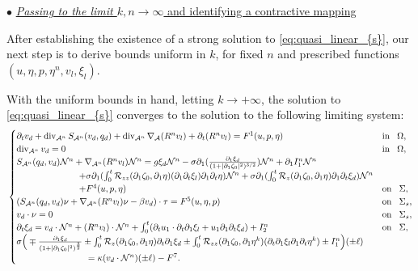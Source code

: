 \documentclass[letterpaper,reqno,10pt,twoside]{amsart}
\theoremstyle{definition}
\theoremstyle{remark}
\def\p{\partial}
\def\dive{\mathop{\rm div}\nolimits}
\begin{document}
	\noindent $\bullet$ \underline{\textsl{Passing to the limit  $k,n \to \infty$} and identifying a contractive mapping} 
	
	After establishing the existence of a strong solution to \eqref{eq:quasi_linear_{s}}, our next step is to derive bounds uniform in $k$, for fixed $n$ and prescribed functions $(u,\eta,p,\eta^{n},v_{l},\xi_{l})$.
	
	With the uniform bounds in hand, letting $k\to +\infty$, the solution to \eqref{eq:quasi_linear_{s}} converges to the solution to the following limiting system:
	\begin{equation}{\label{eq:quasi_linear_{k}}}
		\begin{cases}
			\partial_{t}v_{d}+\operatorname{div}_{\mathcal{A}^{n}}S_{\mathcal{A}^{n}}(v_{d},q_{d})+\dive_{\mathcal{A}^{n}}\nabla_{\mathcal{A}}(R^{n}v_{l})+\p_{t}(R^{n}v_{l})=F^{1}(u,p,\eta)~~~&\operatorname{in}~~\Omega,\\
			\operatorname{div}_{\mathcal{A}^{n}}v_{d}=0~~~&\operatorname{in}~~\Omega,\\
			S_{\mathcal{A}^{n}}(q_{d},v_{d})\mathcal{N}^{n}+\nabla_{\mathcal{A}^{n}}(R^{n}v_{l})\mathcal{N}^{n}=g\xi_{d}\mathcal{N}^{n}-\sigma\partial_{1}(\frac{\p_1\xi_d}{(1+\vert \partial_{1}\zeta_{0}\vert^{2})^{3/2}})\mathcal{N}^{n}+\p_{1}I^{n}_{1}\mathcal{N}^{n}\\
			\quad\quad\quad\quad\quad\quad\quad+\sigma\partial_{1}(\int_{0}^{t}\mathcal{R}_{zz}(\partial_{1}\zeta_{0},\partial_{1}\eta)(\partial_{1}\p_{t}\xi_{l})\p_{1}\p_{t}\eta)\mathcal{N}^{n}+\sigma\partial_{1}(\int_{0}^{t}\mathcal{R}_{z}(\partial_{1}\zeta_{0},\partial_{1}\eta)\partial_{1}\partial_{t}\xi_{d})\mathcal{N}^{n}\\
			\quad\quad\quad\quad\quad\quad\quad+F^{4}(u,p,\eta)~~~&\operatorname{on}~~\Sigma,\\
			(S_{\mathcal{A}^{n}}(q_{d},v_{d})\nu+\nabla_{\mathcal{A}^{n}}(R^{n}v_{l})\nu-\beta v_{d})\cdot \tau=F^{5}(u,\eta,p)~~~&\operatorname{on}~~\Sigma_{s},\\
			v_{d}\cdot \nu=0~~~&\operatorname{on}~~\Sigma_{s},\\
			\partial_{t}\xi_{d}=v_{d}\cdot \mathcal{N}^{n}+(R^{n}v_{l})\cdot \mathcal{N}^{n}+\int_{0}^{t}(\partial_{t}u_{1}\cdot\partial_{t}\p_{1}\xi_{l}+u_{1}\partial_{1}\partial_{t}\xi_{d})+I^{n}_{2}~~~&\operatorname{on}~~\Sigma,\\
			\sigma \Big(\mp \frac{\partial_{1}\xi_{d}}{(1+\vert \partial_{1}\zeta_{0}\vert^{2})^{\frac{3}{2}}}\pm \int_{0}^{t}\mathcal{R}_{z}(\partial_{1}\zeta_{0},\partial_{1}\eta)\partial_{t}\partial_{1}\xi_{d}\pm\int_{0}^{t}\mathcal{R}_{zz}(\p_{1}\zeta_{0},\p_{1}\eta^{k})(\p_{t}\p_{1}\xi_{l}\p_{1}\p_{t}\eta^{k})\pm I^{n}_{1} \Big)(\pm \ell)\\
			\quad\quad\quad\quad\quad\quad\quad\quad=\kappa (v_{d}\cdot \mathcal{N}^{n})(\pm \ell)-{F}^{7}.
		\end{cases}
	\end{equation}
	
\end{document}
